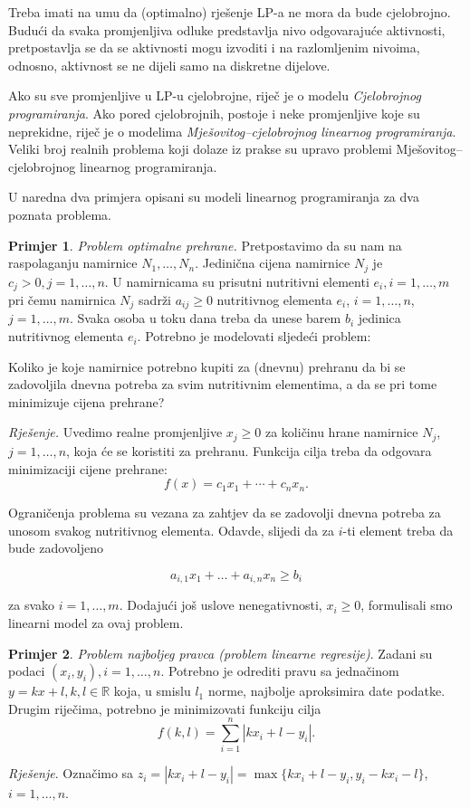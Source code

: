 \documentclass[a4paper, utf8, 11pt, colorlinks]{book}
\theoremstyle{definition}
\newtheorem{primjer}{Primjer}[chapter]
\begin{document}
Treba imati na umu da (optimalno) rješenje LP-a ne mora da bude cjelobrojno. Budući da svaka promjenljiva odluke predstavlja nivo odgovarajuće aktivnosti, pretpostavlja se da se aktivnosti mogu izvoditi i na razlomljenim nivoima, odnosno, aktivnost  se ne dijeli samo na diskretne dijelove. 

Ako su sve promjenljive u LP-u cjelobrojne, riječ je o modelu \emph{Cjelobrojnog programiranja}. Ako pored cjelobrojnih, postoje i neke promjenljive koje su neprekidne, riječ je o modelima \emph{Mješovitog--cjelobrojnog linearnog programiranja}. Veliki broj realnih problema koji dolaze iz prakse su upravo problemi Mješovitog--cjelobrojnog linearnog programiranja.
 

U naredna dva primjera opisani su modeli linearnog programiranja za dva poznata problema. 
\begin{primjer}
\emph{Problem optimalne prehrane.} Pretpostavimo da su nam na raspolaganju namirnice $N_1, \ldots, N_n$. Jedinična cijena namirnice $N_j$ je $c_j>0, j = 1, \ldots, n$. U namirnicama su prisutni nutritivni elementi $e_i,i=1,\ldots,m$ pri čemu
namirnica $N_j$ sadrži $a_{ij} \geq 0$ nutritivnog elementa $e_i$, $i = 1, \ldots, n$, $j = 1, \ldots, m$. Svaka osoba u toku dana treba da unese barem $b_i$
jedinica nutritivnog elementa $e_i$. Potrebno je modelovati
sljedeći problem: 

Koliko je koje namirnice potrebno kupiti za (dnevnu) prehranu da bi se zadovoljila dnevna
potreba za svim nutritivnim elementima, a da se pri tome minimizuje cijena prehrane?
\end{primjer}
 
 \emph{Rješenje.}  Uvedimo realne promjenljive $x_j \geq 0$ za količinu hrane namirnice $N_j$, $j = 1, \ldots, n$, koja će se koristiti za prehranu. Funkcija cilja treba da odgovara minimizaciji cijene prehrane:
 $$f(x) = c_1 x_1 + \cdots + c_n x_n.$$
 
 Ograničenja problema su vezana za zahtjev da se zadovolji dnevna potreba za unosom svakog nutritivnog elementa. Odavde, slijedi da za $i$-ti element treba da bude zadovoljeno
 
 $$ a_{i,1} x_1 + \ldots + a_{i,n} x_n \geq b_i $$
 
 za svako $i=1,\ldots,m$. Dodajući još uslove nenegativnosti, $x_i \geq 0$, formulisali smo linearni model za ovaj problem.  
 \begin{primjer}
\emph{Problem najboljeg pravca (problem linearne regresije)}. Zadani su podaci $(x_i, y_i), i = 1, \ldots , n$. Potrebno je odrediti pravu sa jednačinom $y = k x + l,
k, l \in \mathbb{R}$ koja, u smislu $l_1$ norme, najbolje aproksimira date podatke. Drugim riječima, potrebno je minimizovati  funkciju cilja $$f(k, l) = \sum_{i=1}^n |k x_i + l - y_i|.$$
\end{primjer}
\emph{Rješenje}.
Označimo sa $z_i = |k x_i + l - y_i| = \max\{k x_i + l - y_i, y_i - k x_i - l \}$, $i=1,\ldots,n$. 
\end{document}
